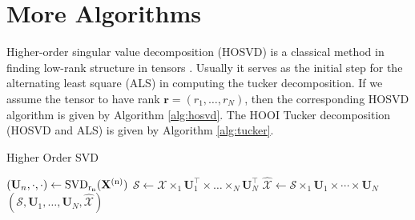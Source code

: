 \section{More Algorithms}

Higher-order singular value decomposition (HOSVD) is a classical method in finding low-rank structure in tensors \cite{de2000multilinear}. Usually it serves as the initial step for the alternating least square (ALS) in computing the tucker decomposition.  If we assume the tensor to have rank $\mathbf{r} = (r_1, \dots, r_N)$, then the corresponding HOSVD algorithm is given by Algorithm \ref{alg:hosvd}. The HOOI Tucker decomposition (HOSVD and ALS) is given by Algorithm \ref{alg:tucker}. 
\begin{algorithm}[!ht]
\caption{Higher Order SVD}\label{alg:hosvd}
  \begin{algorithmic}[2]
  \State $(\mathbf{U}_n, \cdot, \cdot) \leftarrow \rm{SVD}_{r_n}(\mathbf{X}^{(n)})$
  \EndFor
  \State $\mathscr{S} \leftarrow \mathscr{X}\times_1 \mathbf{U}_1^\top \times \dots \times_N \mathbf{U}_N^\top$
  \State $\hat{\mathscr{X}} \leftarrow \mathscr{S} \times_1 \mathbf{U}_1 \times \cdots \times \mathbf{U}_N $
  \State \Return $(\mathscr{S},\mathbf{U}_1, \dots, \mathbf{U}_N, \hat{\mathscr{X}})$
  \EndFunction
\end{algorithmic}
\end{algorithm}

